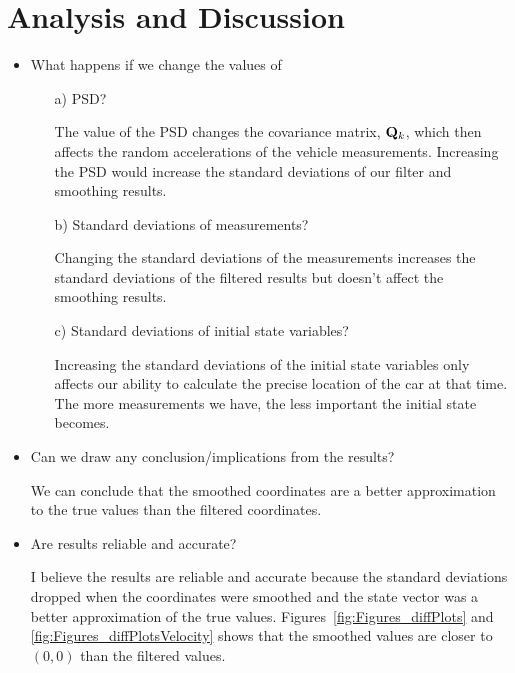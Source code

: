 

\section{Analysis and Discussion} %
\label{sec:analysis_and_discussion}
\begin{itemize}
	\item What happens if we change the values of 
	\begin{itemize}
		\item[a)] PSD?
		
		The value of the PSD changes the covariance matrix, $\mathbf{Q}_k$, which then affects the random accelerations of the vehicle measurements.  Increasing the PSD would increase the standard deviations of our filter and smoothing results.
		\item[b)] Standard deviations of measurements?
		
		Changing the standard deviations of the measurements increases the standard deviations of the filtered results but doesn't affect the smoothing results.
		\item[c)] Standard deviations of initial state variables?
		
		Increasing the standard deviations of the initial state variables only affects our ability to calculate the precise location of the car at that time.  The more measurements we have, the less important the initial state becomes.
	\end{itemize}

	\item Can we draw any conclusion/implications from the results?  
	
	We can conclude that the smoothed coordinates are a better approximation to the true values than the filtered coordinates.
	\item Are results reliable and accurate?
	
	I believe the results are reliable and accurate because the standard deviations dropped when the coordinates were smoothed and the state vector was a better approximation of the true values. Figures~\ref{fig:Figures_diffPlots} and \ref{fig:Figures_diffPlotsVelocity} shows that the smoothed values are closer to $(0,0)$ than the filtered values.

\end{itemize}

